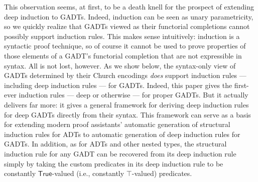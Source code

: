 \documentclass[9pt]{entcs}
\begin{document}
This observation seems, at first, to be a death knell for the prospect
of extending deep induction to GADTs. Indeed, induction can be seen as
unary parametricity, so we quickly realize that GADTs viewed as their
functorial completions cannot possibly support induction rules.  This
makes sense intuitively: induction is a syntactic proof technique, so
of course it cannot be used to prove properties of those elements of a
GADT's functorial completion that are not expressible in syntax. All
is not lost, however. As we show below, the syntax-only view of GADTs
determined by their Church encodings {\em does} support induction
rules --- including deep induction rules --- for GADTs.  Indeed, this
paper gives the first-ever induction rules --- deep or otherwise ---
for proper GADTs. But it actually delivers far more: it gives a
general framework for deriving deep induction rules for deep GADTs
directly from their syntax. This framework can serve as a basis for
extending modern proof assistants' automatic generation of structural
induction rules for ADTs to automatic generation of deep induction
rules for GADTs. In addition, as for ADTs and other nested types, the
structural induction rule for any GADT can be recovered from its deep
induction rule simply by taking the custom predicates in its deep
induction rule to be constantly $\mathsf{True}$-valued (i.e.,
constantly $\mathsf{\top}$-valued) predicates.
\end{document}
